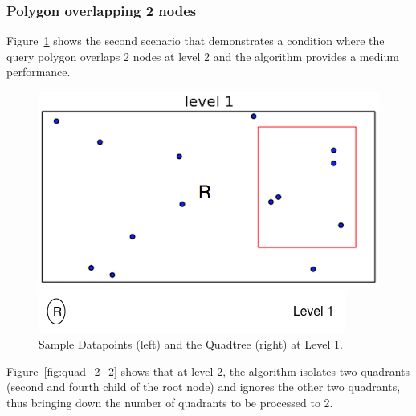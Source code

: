 \subsubsection{Polygon overlapping 2 nodes}

Figure~\ref{fig:quad_1_1} shows the second scenario that demonstrates a condition where the query polygon overlaps 2 nodes at level 2 and the algorithm provides a medium performance. 

\begin{figure}[H]
  \centering
  \vspace{0.5in}
  \begin{minipage}[b]{0.35\textwidth}
    \includegraphics[width=\textwidth]{Images/2Quad_1}
  \end{minipage}
  \hfill
  \begin{minipage}[b]{0.6\textwidth}
    \includegraphics[width=\textwidth]{Images/1_1Quad_1_tree}
  \end{minipage}
  \vspace{0.5in}
  \caption{Sample Datapoints (left) and the Quadtree (right) at Level 1.}
  \label{fig:quad_1_1}
\end{figure}

Figure~\ref{fig:quad_2_2} shows that at level 2, the algorithm isolates two quadrants (second and fourth child of the root node) and ignores the other two quadrants, thus bringing down the number of quadrants to be processed to 2.


